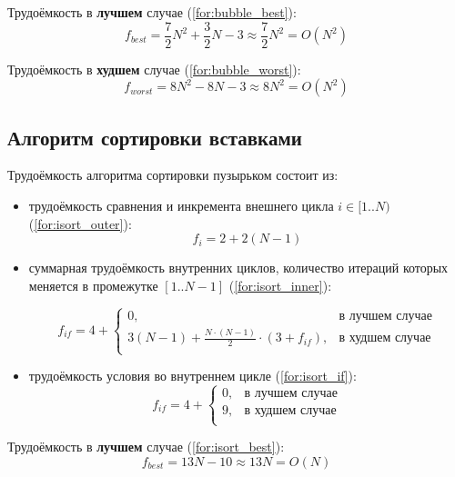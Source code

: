 Трудоёмкость в \textbf{лучшем} случае (\ref{for:bubble_best}):
\begin{equation}
\label{for:bubble_best}
f_{best} = \frac{7}{2} N^2 + \frac{3}{2} N - 3 \approx \frac{7}{2} N^2 = O(N^2)
\end{equation}

Трудоёмкость в \textbf{худшем} случае (\ref{for:bubble_worst}):
\begin{equation}
\label{for:bubble_worst}
f_{worst} =  8N^2 - 8N - 3 \approx 8N^2 = O(N^2)
\end{equation}

\subsection{Алгоритм сортировки вставками}

Трудоёмкость алгоритма сортировки пузырьком состоит из:
\begin{itemize}
	\item трудоёмкость сравнения и инкремента внешнего цикла $i \in [1..N)$ (\ref{for:isort_outer}):
	\begin{equation}
	\label{for:isort_outer}
	f_{i} = 2 + 2(N - 1)
	\end{equation}
	\item суммарная трудоёмкость внутренних циклов, количество итераций которых меняется в промежутке $[1..N-1]$ (\ref{for:isort_inner}):

	\begin{equation}
	\label{for:isort_inner}
	f_{if} = 4 + \begin{cases}
		0, & \text{в лучшем случае}\\
		3(N - 1) + \frac{N \cdot (N - 1)}{2} \cdot (3 + f_{if}), & \text{в худшем случае}\\
	\end{cases}
	\end{equation}

	\item трудоёмкость условия во внутреннем цикле (\ref{for:isort_if}):
	\begin{equation}
	\label{for:isort_if}
	f_{if} = 4 + \begin{cases}
	0, & \text{в лучшем случае}\\
	9, & \text{в худшем случае}\\
	\end{cases}
	\end{equation}
\end{itemize}

Трудоёмкость в \textbf{лучшем} случае (\ref{for:isort_best}):
\begin{equation}
\label{for:isort_best}
f_{best} = 13N - 10 \approx 13N = O(N)
\end{equation}

